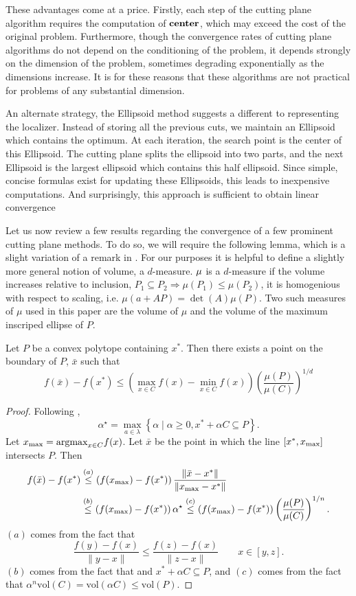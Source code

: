 These advantages come at a price. Firstly, each step of the cutting
plane algorithm requires the computation of ${\bf center}$, which may
exceed the cost of the original problem. Furthermore, though the
convergence rates of cutting plane algorithms do not depend on the
conditioning of the problem, it depends strongly on the dimension of
the problem, sometimes degrading exponentially as the dimensions
increase. It is for these reasons that these algorithms are not
practical for problems of any substantial dimension.

An alternate strategy, the Ellipsoid method \cite{bland1981ellipsoid} suggests
a different to representing the localizer. Instead of storing all the previous
cuts, we maintain an  Ellipsoid which contains the optimum. At each iteration,
the search point is the center of this Ellipsoid. The cutting plane splits the
ellipsoid into two parts, and the next Ellipsoid is the largest ellipsoid
which contains this half ellipsoid.  Since simple, concise formulas exist for
updating these Ellipsoids,  this leads to inexpensive computations. And
surprisingly, this approach is sufficient to obtain linear convergence


Let us now review a few results regarding the convergence of a few prominent
cutting plane methods. To do so, we will require the following lemma, which is
a slight variation of a remark in \cite{tarasov1988method}. For our purposes
it is helpful to define a slightly more general notion of volume, a
$d$-measure. $\mu$ is a $d$-measure if the volume increases relative to
inclusion, $P_1 \subseteq P_2 \Rightarrow \mu(P_1) \leq \mu(P_2)$, it is
homogenious with respect to scaling, i.e. $\mu(a+AP)=\det(A)\mu(P)$. Two such
measures of $\mu$ used in this paper are the volume of $\mu$ and the volume of
the maximum inscriped ellipse of $P$.

\begin{lem}\label{lem:lem-voldecrease} Let $P$ be a convex polytope containing $x^*$. Then there exists a point on the boundary of $P$, $\bar{x}$ such that
$$
f(\bar{x})-f(x^{*})\leq\left(\max_{x\in C}f(x)-\min_{x\in C}f(x)\right)\left(\frac{\mu(P)}{\mu(C)}\right)^{1/d}
$$
\end{lem}
\begin{proof}
Following \cite{tarasov1988method},  
$$\alpha^\star = \max_{a\in\lambda}\left\{ \alpha\mid\alpha\geq0,x^*+\alpha C\subseteq P\right\}.$$ 
Let $x_{\max} = \mbox{argmax}_{x\in C} f(x)$. Let $\bar{x}$ be the point in which the line $[x^*, x_{\max} ]$ intersects $P$. Then
\begin{align*}
f(\bar{x})-f(x^{*}) & \overset{(a)}{\leq}\left(f(x_{\max})-f(x^{*})\right)\frac{\|\bar{x}-x^{*}\|}{\|x_{\max}-x^{*}\|}\\
 & \overset{(b)}{\leq}\left(f(x_{\max})-f(x^{*})\right)\alpha^\star
 \overset{(c)}{\leq}\left(f(x_{\max})-f(x^{*})\right)\left(\frac{\mu(P)}{\mu(C)}\right)^{1/n}.
\end{align*}
$(a)$ comes from the fact that $$\frac{f(y)-f(x)}{\|y-x\|}\leq\frac{f(z)-f(x)}{\|z-x\|} \qquad x \in [y,z].$$$(b)$ comes from the fact that and $x^* + \alpha C \subseteq P$, and $(c)$ comes from the fact that $\alpha^n \mbox{vol}(C) =  \mbox{vol}(\alpha C) \leq \mbox{vol}(P).$
\end{proof}

